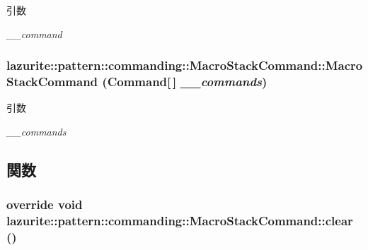 \begin{DoxyParams}{引数}
\item[{\em \_\-\_\-command}]\end{DoxyParams}
\hypertarget{classlazurite_1_1pattern_1_1commanding_1_1_macro_stack_command_aad7ea8e50da80eb37b81550081efa142}{
\subsubsection[{MacroStackCommand}]{\setlength{\rightskip}{0pt plus 5cm}lazurite::pattern::commanding::MacroStackCommand::MacroStackCommand ({\bf Command}\mbox{[}$\,$\mbox{]} {\em \_\-\_\-commands})}}
\label{classlazurite_1_1pattern_1_1commanding_1_1_macro_stack_command_aad7ea8e50da80eb37b81550081efa142}

\begin{DoxyParams}{引数}
\item[{\em \_\-\_\-commands}]\end{DoxyParams}


\subsection{関数}
\hypertarget{classlazurite_1_1pattern_1_1commanding_1_1_macro_stack_command_ab0861f5fbede48b5d0a452e5727e737d}{
\subsubsection[{clear}]{\setlength{\rightskip}{0pt plus 5cm}override void lazurite::pattern::commanding::MacroStackCommand::clear ()}}
\label{classlazurite_1_1pattern_1_1commanding_1_1_macro_stack_command_ab0861f5fbede48b5d0a452e5727e737d}


